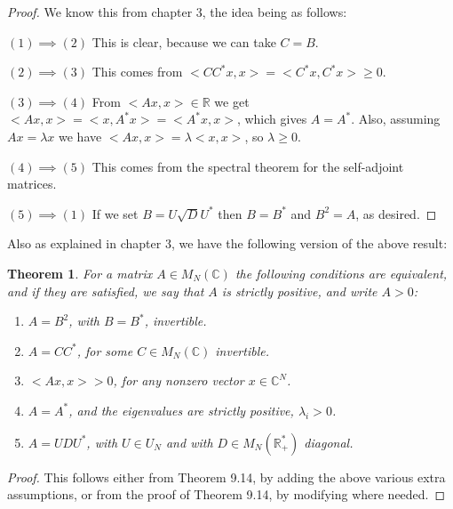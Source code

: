 \documentclass[12pt]{amsbook}
\newtheorem{theorem}{Theorem}[chapter]
\begin{document}
\begin{proof}
We know this from chapter 3, the  idea being as follows:

\medskip

$(1)\implies(2)$ This is clear, because we can take $C=B$.

\medskip

$(2)\implies(3)$ This comes from $<CC^*x,x>=<C^*x,C^*x>\geq0$.

\medskip

$(3)\implies(4)$ From $<Ax,x>\in\mathbb R$ we get $<Ax,x>=<x,A^*x>=<A^*x,x>$, which gives $A=A^*$. Also, assuming $Ax=\lambda x$ we have $<Ax,x>=\lambda<x,x>$, so $\lambda\geq0$.

\medskip

$(4)\implies(5)$ This comes from the spectral theorem for the self-adjoint matrices.

\medskip

$(5)\implies(1)$ If we set $B=U\sqrt{D}U^*$ then $B=B^*$ and $B^2=A$, as desired.
\end{proof}

Also as explained in chapter 3, we have the following version of the above result:


\begin{theorem}
For a matrix $A\in M_N(\mathbb C)$ the following conditions are equivalent, and if they are satisfied, we say that $A$ is strictly positive, and write $A>0$:
\begin{enumerate}
\item $A=B^2$, with $B=B^*$, invertible.

\item $A=CC^*$, for some $C\in M_N(\mathbb C)$ invertible.

\item $<Ax,x>>0$, for any nonzero vector $x\in\mathbb C^N$.

\item $A=A^*$, and the eigenvalues are strictly positive, $\lambda_i>0$.

\item $A=UDU^*$, with $U\in U_N$ and with $D\in M_N(\mathbb R_+^*)$ diagonal.
\end{enumerate}
\end{theorem}

\begin{proof}
This follows either from Theorem 9.14, by adding the above various extra assumptions, or from the proof of Theorem 9.14, by modifying where needed.
\end{proof}
\end{document}
